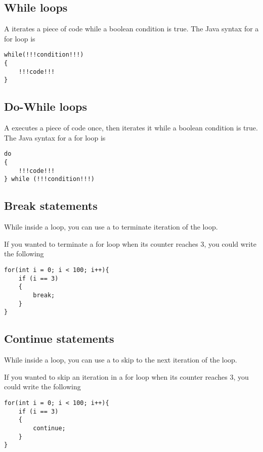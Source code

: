 \documentclass[11pt]{report}
\begin{document}
\subsection{While loops}
A  iterates a piece of code while a boolean condition is true. The Java syntax for a for loop is
\vspace{-20pt}
\begin{lstlisting}[style=javaSyntax]
while(!!!condition!!!)
{
    !!!code!!!
}
\end{lstlisting}
\subsection{Do-While loops}
A  executes a piece of code once, then iterates it while a boolean condition is true. The Java syntax for a for loop is
\vspace{-20pt}
\begin{lstlisting}[style=javaSyntax]
do
{
    !!!code!!!
} while (!!!condition!!!)
\end{lstlisting}

\subsection{Break statements}
While inside a loop, you can use a  to terminate iteration of the loop.
\begin{eg} If you wanted to terminate a for loop when its counter reaches 3, you could write the following
\vspace{-15pt}
\begin{lstlisting}
for(int i = 0; i < 100; i++){
    if (i == 3)
    {
        break;
    }
}
\end{lstlisting}
\end{eg}

\subsection{Continue statements}
While inside a loop, you can use a  to skip to the next iteration of the loop.
\begin{eg} If you wanted to skip an iteration in a for loop when its counter reaches 3, you could write the following
\vspace{-15pt}
\begin{lstlisting}
for(int i = 0; i < 100; i++){
    if (i == 3)
    {
        continue;
    }
}
\end{lstlisting}
\end{eg}
\pagebreak
\end{document}

